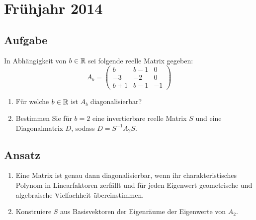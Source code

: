 \newpage

\section{Frühjahr 2014}

\subsection{Aufgabe}
In Abhängigkeit von \( b \in \mathbb{R} \) sei folgende reelle Matrix gegeben:
\begin{equation*}
	A_b = \begin{pmatrix}
		b & b -1 & 0 \\
		-3 & -2 & 0 \\
		b+1 & b-1 & -1
	\end{pmatrix}
\end{equation*}
\begin{enumerate}
	\item Für welche \( b \in \mathbb{R} \) ist \( A_b \) diagonalisierbar?
	\item Bestimmen Sie für \( b = 2 \) eine invertierbare reelle Matrix \( S \) und eine Diagonalmatrix \( D \), sodass \( D = S^{-1}A_2S \). 
\end{enumerate}

\subsection{Ansatz}
\begin{enumerate}
	\item Eine Matrix ist genau dann diagonalisierbar, wenn ihr charakteristisches Polynom in Linearfaktoren zerfällt und für jeden Eigenwert geometrische und algebraische Vielfachheit übereinstimmen.
	\item Konstruiere \( S \) aus Basisvektoren der Eigenräume der Eigenwerte von \( A_2 \). 
\end{enumerate}

